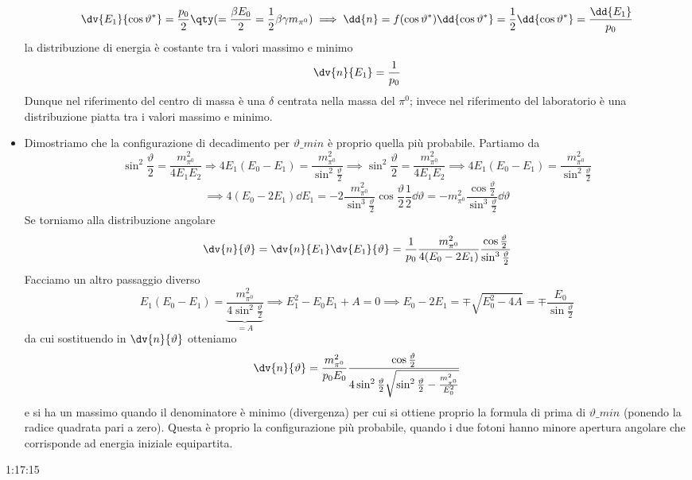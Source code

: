 \begin{itemize}
\begin{equation*}
        \dv{E_1}{\cos\vartheta^*}=\frac{p_0}2\qty(=\frac{\beta E_0}2=\frac12\beta\gamma m_{\pi^0})\implies \dd{n}=f(\cos\vartheta^*)\dd{\cos\vartheta^*}=\frac12\dd{\cos\vartheta^*}=\frac{\dd{E_1}}{p_0}
    \end{equation*}
    la distribuzione di energia è costante tra i valori massimo e minimo
    \begin{equation*}
        \dv{n}{E_1}=\frac{1}{p_0}
    \end{equation*}
    Dunque nel riferimento del centro di massa è una $\delta$ centrata nella massa del $\pi^0$; invece nel riferimento del laboratorio è una distribuzione piatta tra i valori massimo e minimo.
    \item Dimostriamo che la configurazione di decadimento per $\vartheta\_{min}$ è proprio quella più probabile. Partiamo da 
    \begin{equation*}
        \sin^2\frac{\vartheta}{2}=\frac{m_{\pi^0}^2}{4E_1E_2}\Rightarrow 4E_1(E_0-E_1)=\frac{m_{\pi^0}^2}{\sin^2\frac{\vartheta}{2}}{\implies}{}
        \sin^2\frac{\vartheta}{2}=\frac{m_{\pi^0}^2}{4E_1E_2}\implies 4E_1(E_0-E_1)=\frac{m_{\pi^0}^2}{\sin^2\frac{\vartheta}{2}}
    \end{equation*}
    \begin{equation*}
        \implies 4(E_0-2E_1)\dd{E_1}=-2\frac{m_{\pi^0}^2}{\sin^3\frac{\vartheta}{2}}\cos\frac{\vartheta}{2}\frac12\dd{\vartheta}=-m_{\pi^0}^2\frac{\cos\frac{\vartheta}{2}}{\sin^3\frac{\vartheta}{2}}\dd{\vartheta}
    \end{equation*}
    Se torniamo alla distribuzione angolare
    \begin{equation*}
        \dv{n}{\vartheta}=\dv{n}{E_1}\dv{E_1}{\vartheta}=\frac1{p_0}\frac{m_{\pi^0}^2}{4(E_0-2E_1)}\frac{\cos\frac{\vartheta}{2}}{\sin^3\frac{\vartheta}{2}}
    \end{equation*}
    Facciamo un altro passaggio diverso
    \begin{equation*}
        E_1(E_0-E_1)=\underbrace{\frac{m_{\pi^0}^2}{4\sin^2\frac{\vartheta}{2}}}_{=A}\implies E_1^2-E_0E_1+A=0\implies E_0-2E_1=\mp\sqrt{E_0^2-4A}=\mp\frac{E_0}{\sin\frac\vartheta2}
    \end{equation*}
    da cui sostituendo in $\dv{n}{\vartheta}$ otteniamo
    \begin{equation*}
        \dv{n}{\vartheta}=\frac{m_{\pi^0}^2}{p_0E_0}\frac{\cos\frac{\vartheta}{2}}{4\sin^2\frac{\vartheta}{2}\sqrt{\sin^2\frac{\vartheta}{2}-\frac{m_{\pi^0}^2}{E_0^2}}}
    \end{equation*}
    e si ha un massimo quando il denominatore è minimo (divergenza) per cui si ottiene proprio la formula di prima di $\vartheta\_{min}$ (ponendo la radice quadrata pari a zero). Questa è proprio la configurazione più probabile, quando i due fotoni hanno minore apertura angolare che corrisponde ad energia iniziale equipartita.
\end{itemize}
1:17:15
